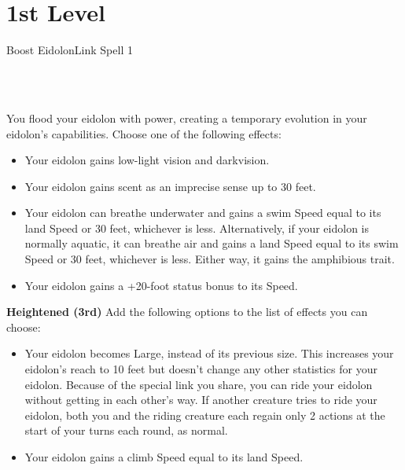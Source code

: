 \documentclass[12pt,openany,twocolumn]{book}
\begin{document}
\section*{1st Level}

\begin{spell}{Boost Eidolon}{}{Link Spell 1}
    \begin{spellinfo}
         \\
         \\
    \end{spellinfo}

    \begin{spellbody}
        You flood your eidolon with power, creating a temporary evolution in your eidolon's capabilities. Choose one of the following effects:

        \begin{itemize}
            \item Your eidolon gains low-light vision and darkvision.
            \item Your eidolon gains scent as an imprecise sense up to 30 feet.
            \item Your eidolon can breathe underwater and gains a swim Speed equal to its land Speed or 30 feet, whichever is less. Alternatively, if your eidolon is normally aquatic, it can breathe air and gains a land Speed equal to its swim Speed or 30 feet, whichever is less. Either way, it gains the amphibious trait.
            \item Your eidolon gains a +20-foot status bonus to its Speed.
        \end{itemize}
    \end{spellbody}

    \indent\textbf{Heightened (3rd)} Add the following options to the list of effects you can choose:
    \begin{itemize}
        \item Your eidolon becomes Large, instead of its previous size. This increases your eidolon's reach to 10 feet but doesn't change any other statistics for your eidolon. Because of the special link you share, you can ride your eidolon without getting in each other's way. If another creature tries to ride your eidolon, both you and the riding creature each regain only 2 actions at the start of your turns each round, as normal.
        \item Your eidolon gains a climb Speed equal to its land Speed.
    \end{itemize}


\end{spell}
\end{document}
